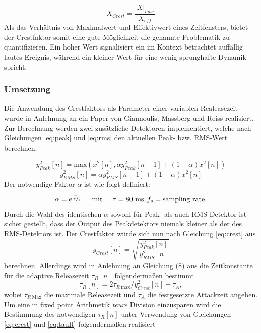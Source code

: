 \documentclass[paper=a4, fontsize=12pt]{scrartcl}
\numberwithin{equation}{section}		%
\numberwithin{figure}{section}			%
\numberwithin{table}{section}				%
\begin{document}
\begin{equation}
\label{eq:crest}
	X_{Crest} = \frac{|X|_{max}}{X_{eff}}
\end{equation}
Als das Verhältnis von Maximalwert und Effektivwert eines Zeitfensters, bietet der Crestfaktor somit eine gute Möglichkeit die genannte Problematik zu quantifizieren. Ein hoher Wert signalisiert ein im Kontext betrachtet auffällig lautes Ereignis, während ein kleiner Wert für eine wenig sprunghafte Dynamik spricht.

\subsubsection{Umsetzung}
Die Anwendung des Crestfaktors als Parameter einer variablen Realeasezeit wurde in Anlehnung an ein Paper von Giannoulis, Massberg und Reiss realisiert.\cite{giannoulis2013parameter}
Zur Berechnung werden zwei zusätzliche Detektoren implementiert, welche nach Gleichungen \ref{eq:peak} und \ref{eq:rms} den aktuellen Peak- bzw. RMS-Wert berechnen. 

\begin{equation}
\label{eq:peak}
	y^2_{Peak}[n] = \text{max}(x^2[n], \alpha y^2_{Peak}[n-1]+(1-\alpha)x^2[n])
\end{equation}
\begin{equation}
	y^2_{RMS}[n] = \alpha y^2_{RMS}[n-1] + (1-\alpha)x^2[n]
\end{equation}
Der notwendige Faktor $\alpha$ ist wie folgt definiert: $$\alpha = e^{\frac{-1}{\tau f_s}} \hspace{0.5cm} \text{mit} \hspace{0.5cm} \tau = 80~\text{ms}, f_s = \text{sampling rate}.$$
Durch die Wahl des identischen $\alpha$ sowohl für Peak- als auch RMS-Detektor ist sicher gestellt, dass der Output des Peakdetektors niemals kleiner als der des RMS-Detektors ist.
Der Crestfaktor würde sich nun nach Gleichung \ref{eq:crest} aus $$y_{Crest}[n] = \sqrt{\frac{y^2_{Peak}[n]}{y^2_{RMS}[n]}}$$ berechnen. Allerdings wird in Anlehnung an Gleichung (8) aus \cite{giannoulis2013parameter} die Zeitkonstante für die adaptive Releasezeit $\tau_R[n]$ folgendermaßen bestimmt
\begin{equation}
\label{eq:tauR}
	\tau_R[n] = 2\tau_{R~\text{max}}/y^2_{Crest}[n] - \tau_{A},
\end{equation}
wobei $\tau_{R~\text{Max}}$ die maximale Releasezeit und $\tau_A$ die festgesetzte Attackzeit angeben.
Um eine in fixed point Arithmetik \textit{teure} Division einzusparen wird die Bestimmung des notwendigen $\tau_R[n]$ unter Verwendung von Gleichungen \ref{eq:crest} und \ref{eq:tauR} folgendermaßen realisiert
\end{document}
